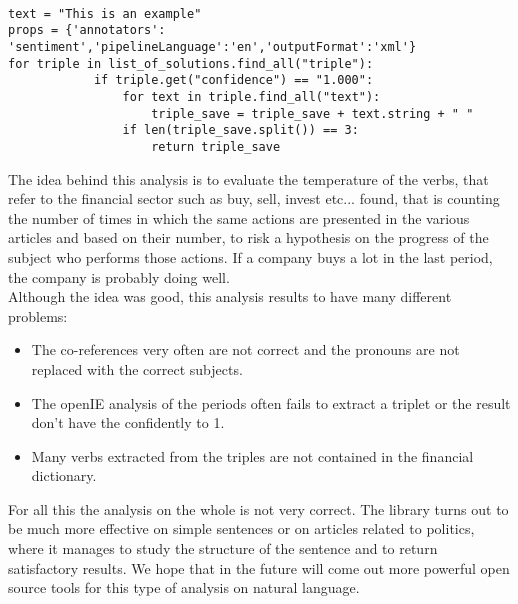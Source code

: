 \begin{verbatim}
               
text = "This is an example"
props = {'annotators': 'sentiment','pipelineLanguage':'en','outputFormat':'xml'}
for triple in list_of_solutions.find_all("triple"):
            if triple.get("confidence") == "1.000":
                for text in triple.find_all("text"):
                    triple_save = triple_save + text.string + " "
                if len(triple_save.split()) == 3:
                    return triple_save
\end{verbatim}

The idea behind this analysis is to evaluate the temperature of the verbs, that refer to the financial sector such as buy, sell, invest etc... found, that is counting the number of times in which the same actions are presented in the various articles and based on their number, to risk a hypothesis on the progress of the subject who performs those actions. If a company buys a lot in the last period, the company is probably doing well.\\
Although the idea was good, this analysis results to have many different problems:
\begin{itemize}
\item
The co-references very often are not correct and the pronouns are not replaced with the correct subjects.
\item
The openIE analysis of the periods often fails to extract a triplet or the result don't have the confidently to 1.
\item
Many verbs extracted from the triples are not contained in the financial dictionary.
\end{itemize}
For all this the analysis on the whole is not very correct.
The library turns out to be much more effective on simple sentences or on articles related to politics, where it manages to study the structure of the sentence and to return satisfactory results. We hope that in the future will come out more powerful open source tools for this type of analysis on natural language.

